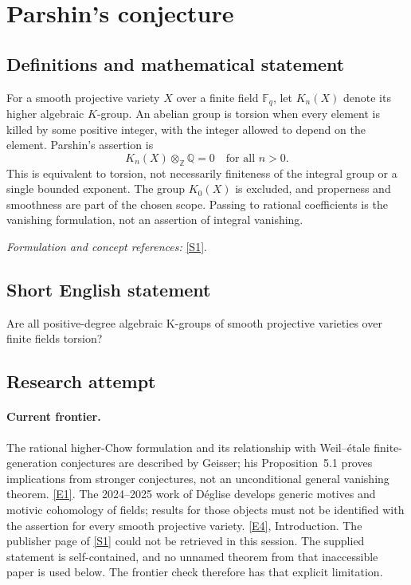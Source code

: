 \documentclass[11pt,a4paper]{article}
\newcommand{\Z}{\mathbb{Z}}
\newcommand{\Q}{\mathbb{Q}}
\newcommand{\F}{\mathbb{F}}
\newcommand{\sref}[2]{\hyperlink{source:#1:#2}{[S#2]}}
\newcommand{\eref}[2]{\hyperlink{extra:#1:#2}{[E#2]}}
\newif\ifshowcatalogue
\newcommand{\cataloguescope}[1]{\ifshowcatalogue
 \paragraph{Exact scope in the supplied catalogue.}
 \begin{quote}\small #1\end{quote}\fi}
\numberwithin{equation}{section}
\begin{document}
\setcounter{section}{0}
\clearpage
\section*{\texorpdfstring{Parshin's conjecture}{Parshin's conjecture}}\label{7200016}
\subsection{Definitions and mathematical statement}
For a smooth projective variety $X$ over a finite field $\F_q$, let $K_n(X)$ denote its higher algebraic $K$-group. An abelian group is torsion when every element is killed by some positive integer, with the integer allowed to depend on the element. Parshin's assertion is
\[
 K_n(X)\otimes_{\Z}\Q=0\quad\text{for all }n>0.
\]
This is equivalent to torsion, not necessarily finiteness of the integral group or a single bounded exponent. The group $K_0(X)$ is excluded, and properness and smoothness are part of the chosen scope. Passing to rational coefficients is the vanishing formulation, not an assertion of integral vanishing.
\par\smallskip\textit{Formulation and concept references:} \sref{7200016}{1}.
\cataloguescope{Prove that for every smooth projective variety X over a finite field and every integer n greater than zero, the higher algebraic K-group K\_n(X) is torsion.}
\subsection{Short English statement}
Are all positive-degree algebraic K-groups of smooth projective varieties over finite fields torsion?
\subsection{Research attempt}

\paragraph{Current frontier.}
The rational higher-Chow formulation and its relationship with
Weil--\'etale finite-generation conjectures are described by Geisser;
his Proposition~5.1 proves implications from stronger conjectures, not
an unconditional general vanishing theorem. \eref{7200016}{1}.
The 2024--2025 work of D\'eglise develops generic motives and motivic
cohomology of fields; results for those objects must not be identified
with the assertion for every smooth projective variety.
\eref{7200016}{4}, Introduction. The publisher page of \sref{7200016}{1} could
not be retrieved in this session. The supplied statement is
self-contained, and no unnamed theorem from that inaccessible paper is
used below. The frontier check therefore has that explicit limitation.
\end{document}

